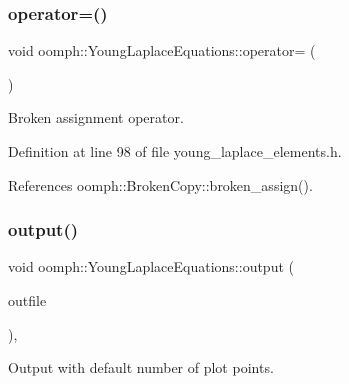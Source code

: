 \mbox{\label{classoomph_1_1YoungLaplaceEquations_abcf80ec6ad8e642144b648271e096330}} 
\subsubsection{\texorpdfstring{operator=()}{operator=()}}
{\footnotesize\ttfamily void oomph\+::\+Young\+Laplace\+Equations\+::operator= (\begin{DoxyParamCaption}\item[{const \hyperlink{classoomph_1_1YoungLaplaceEquations}{Young\+Laplace\+Equations} \&}]{ }\end{DoxyParamCaption})\hspace{0.3cm}{\ttfamily [inline]}}



Broken assignment operator. 



Definition at line 98 of file young\+\_\+laplace\+\_\+elements.\+h.



References oomph\+::\+Broken\+Copy\+::broken\+\_\+assign().

\mbox{\label{classoomph_1_1YoungLaplaceEquations_a91fb5787aae4e4f5ed2d777f759170f3}} 
\subsubsection{\texorpdfstring{output()}{output()}\hspace{0.1cm}{\footnotesize\ttfamily [1/2]}}
{\footnotesize\ttfamily void oomph\+::\+Young\+Laplace\+Equations\+::output (\begin{DoxyParamCaption}\item[{std\+::ostream \&}]{outfile }\end{DoxyParamCaption})\hspace{0.3cm}{\ttfamily [inline]}, {\ttfamily [virtual]}}



Output with default number of plot points. 



